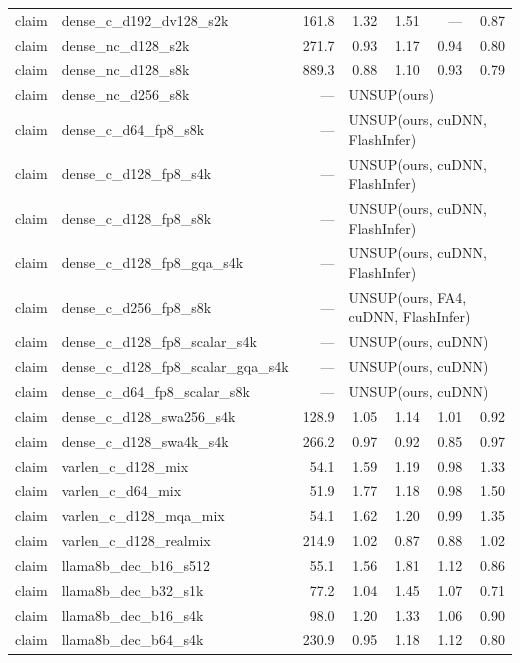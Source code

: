 \begin{longtable}{@{}llrrrrr@{}}
claim & dense\_c\_d192\_dv128\_s2k & 161.8 & 1.32 & 1.51 & --- & 0.87 \\
claim & dense\_nc\_d128\_s2k & 271.7 & 0.93 & 1.17 & 0.94 & 0.80 \\
claim & dense\_nc\_d128\_s8k & 889.3 & 0.88 & 1.10 & 0.93 & 0.79 \\
claim & dense\_nc\_d256\_s8k & --- & \multicolumn{4}{l}{UNSUP({ours})} \\
claim & dense\_c\_d64\_fp8\_s8k & --- & \multicolumn{4}{l}{UNSUP({ours, cuDNN, FlashInfer})} \\
claim & dense\_c\_d128\_fp8\_s4k & --- & \multicolumn{4}{l}{UNSUP({ours, cuDNN, FlashInfer})} \\
claim & dense\_c\_d128\_fp8\_s8k & --- & \multicolumn{4}{l}{UNSUP({ours, cuDNN, FlashInfer})} \\
claim & dense\_c\_d128\_fp8\_gqa\_s4k & --- & \multicolumn{4}{l}{UNSUP({ours, cuDNN, FlashInfer})} \\
claim & dense\_c\_d256\_fp8\_s8k & --- & \multicolumn{4}{l}{UNSUP({ours, FA4, cuDNN, FlashInfer})} \\
claim & dense\_c\_d128\_fp8\_scalar\_s4k & --- & \multicolumn{4}{l}{UNSUP({ours, cuDNN})} \\
claim & dense\_c\_d128\_fp8\_scalar\_gqa\_s4k & --- & \multicolumn{4}{l}{UNSUP({ours, cuDNN})} \\
claim & dense\_c\_d64\_fp8\_scalar\_s8k & --- & \multicolumn{4}{l}{UNSUP({ours, cuDNN})} \\
claim & dense\_c\_d128\_swa256\_s4k & 128.9 & 1.05 & 1.14 & 1.01 & 0.92 \\
claim & dense\_c\_d128\_swa4k\_s4k & 266.2 & 0.97 & 0.92 & 0.85 & 0.97 \\
claim & varlen\_c\_d128\_mix & 54.1 & 1.59 & 1.19 & 0.98 & 1.33 \\
claim & varlen\_c\_d64\_mix & 51.9 & 1.77 & 1.18 & 0.98 & 1.50 \\
claim & varlen\_c\_d128\_mqa\_mix & 54.1 & 1.62 & 1.20 & 0.99 & 1.35 \\
claim & varlen\_c\_d128\_realmix & 214.9 & 1.02 & 0.87 & 0.88 & 1.02 \\
claim & llama8b\_dec\_b16\_s512 & 55.1 & 1.56 & 1.81 & 1.12 & 0.86 \\
claim & llama8b\_dec\_b32\_s1k & 77.2 & 1.04 & 1.45 & 1.07 & 0.71 \\
claim & llama8b\_dec\_b16\_s4k & 98.0 & 1.20 & 1.33 & 1.06 & 0.90 \\
claim & llama8b\_dec\_b64\_s4k & 230.9 & 0.95 & 1.18 & 1.12 & 0.80 \\

\end{longtable}
